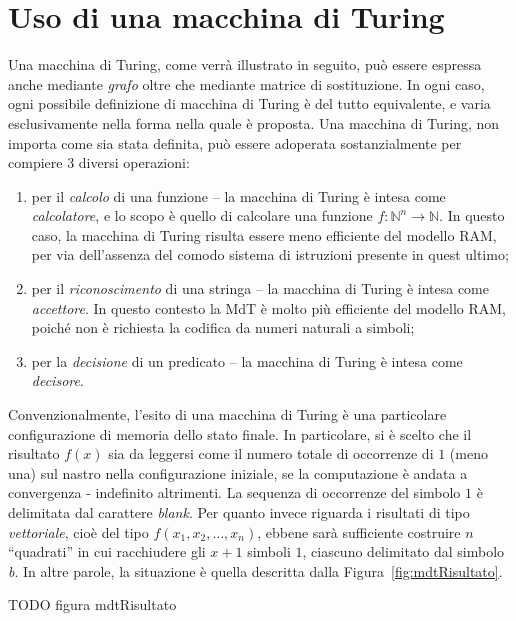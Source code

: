 \documentclass[10pt]{book}
\begin{document}
\section{Uso di una macchina di Turing}

Una macchina di Turing, come verrà illustrato in seguito, può essere espressa
anche mediante \emph{grafo} oltre che mediante matrice di sostituzione. In ogni
caso, ogni possibile definizione di macchina di Turing è del tutto equivalente,
e varia esclusivamente nella forma nella quale è proposta. Una macchina di
Turing, non importa come sia stata definita, può essere adoperata
sostanzialmente per compiere $3$ diversi operazioni:
\begin{enumerate}
    \item per il \emph{calcolo} di una funzione \--- la macchina di Turing è
        intesa come \emph{calcolatore}, e lo scopo è quello di calcolare una
        funzione $f: \mathbb{N}^n \rightarrow \mathbb{N}$. In questo caso, la
        macchina di Turing risulta essere meno efficiente del modello RAM, per
        via dell'assenza del comodo sistema di istruzioni presente in quest
        ultimo;
    \item per il \emph{riconoscimento} di una stringa \--- la macchina di
        Turing è intesa come \emph{accettore}. In questo contesto la MdT è
        molto più efficiente del modello RAM, poiché non è richiesta la
        codifica da numeri naturali a simboli;
    \item per la \emph{decisione} di un predicato \--- la macchina di Turing è
        intesa come \emph{decisore}.
\end{enumerate}

Convenzionalmente, l'esito di una macchina di Turing è una particolare
configurazione di memoria dello stato finale. In particolare, si è scelto che
il risultato $f(x)$ sia da leggersi come il numero totale di occorrenze di $1$
(meno una) sul nastro nella configurazione iniziale, se la computazione è
andata a convergenza \-- indefinito altrimenti. La sequenza di occorrenze del
simbolo $1$ è delimitata dal carattere \emph{blank}. Per quanto invece riguarda
i risultati di tipo \emph{vettoriale}, cioè del tipo $f(x_1,x_2,\dots,x_n)$,
ebbene sarà sufficiente costruire $n$ ``quadrati'' in cui racchiudere gli $x+1$
simboli $1$, ciascuno delimitato dal simbolo \emph{b}. In altre parole, la
situazione è quella descritta dalla Figura~\ref{fig:mdtRisultato}.

TODO figura mdtRisultato
\end{document}
